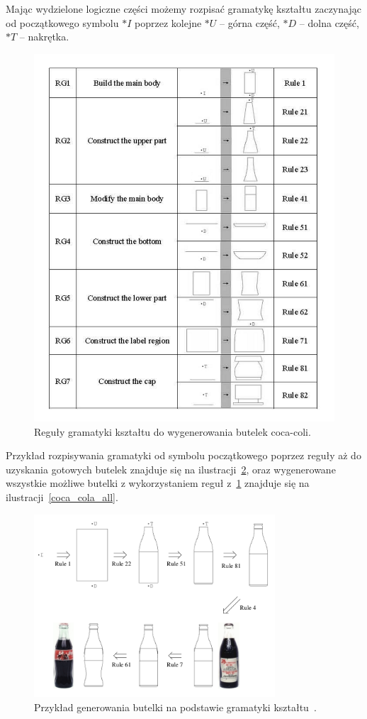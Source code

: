 Mając wydzielone logiczne części możemy rozpisać gramatykę kształtu zaczynając
od początkowego symbolu $*I$ poprzez kolejne $*U$ -- górna część, $*D$ -- dolna
część, $*T$ -- nakrętka.

\begin{figure}[h!]
\centering
\includegraphics[width=12cm]{images/table01.png}
\caption{Reguły gramatyki kształtu do wygenerowania butelek
coca-coli.~\cite{link10}}
\label{coca-cola_regules}
\end{figure}

Przykład rozpisywania gramatyki od symbolu początkowego poprzez reguły aż do
uzyskania gotowych butelek znajduje się na ilustracji~\ref{coca_cola_create},
oraz wygenerowane wszystkie możliwe butelki z wykorzystaniem reguł
z~\ref{coca-cola_regules} znajduje się na ilustracji~\ref{coca_cola_all}.


\begin{figure}[h!]
\centering
\includegraphics[width=9cm]{images/coca-cola_create.png}
\caption{Przykład generowania butelki na podstawie gramatyki
kształtu~\cite{link10}.}
\label{coca_cola_create}
\end{figure}

